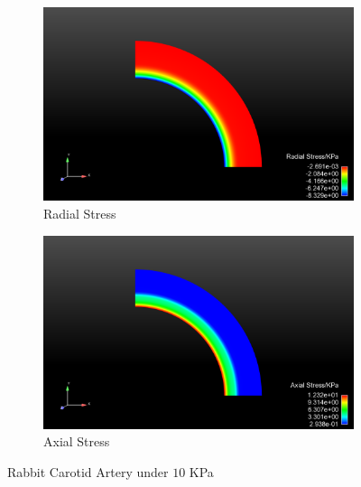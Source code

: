 \begin{figure}[t!p]
	\begin{subfigure}[b]{0.5\textwidth}
		\centering
		\includegraphics[width=\textwidth]{./figures/artery_radial.png}
		\caption{Radial Stress}
		\label{radial_artery}
	\end{subfigure}
	\begin{subfigure}[b]{0.5\textwidth}
		\centering
		\includegraphics[width=\textwidth]{./figures/artery_axial.png}
		\caption{Axial Stress}
		\label{axial_artery}
	\end{subfigure}
	\caption{Rabbit Carotid Artery under $10$ KPa}
	\label{fig:artery}
\end{figure}

